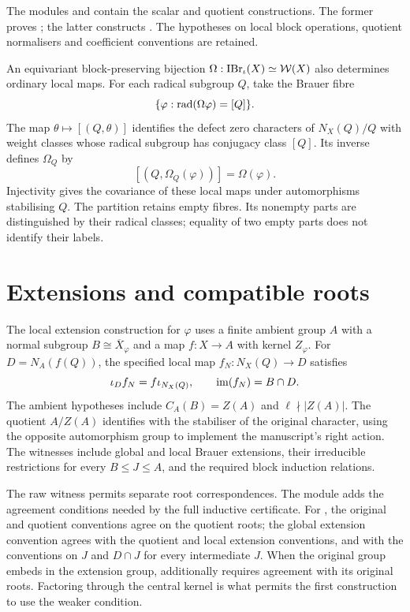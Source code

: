 \begin{samepage}
\begin{implementation}
The modules
and
contain the scalar and quotient constructions. The former proves
; the latter constructs
. The hypotheses on local block
operations, quotient normalisers and coefficient conventions are retained.
\end{implementation}
\end{samepage}

An equivariant block-preserving bijection
$\Omega:\operatorname{IBr}_\iota(X)\simeq\mathcal W(X)$ also determines ordinary
local maps. For each radical subgroup $Q$, take the Brauer fibre
\[
 \{\varphi:\operatorname{rad}(\Omega\varphi)=[Q]\}.
\]
The map $\theta\mapsto[(Q,\theta)]$ identifies the defect zero
characters of $N_X(Q)/Q$ with weight classes whose radical subgroup
has conjugacy class $[Q]$. Its inverse defines $\Omega_Q$ by
\[
 [(Q,\Omega_Q(\varphi))]=\Omega(\varphi).
\]
Injectivity gives the covariance of these local maps under
automorphisms stabilising $Q$. The partition retains empty fibres.
Its nonempty parts are distinguished by their radical classes;
equality of two empty parts does not identify their labels.

\section{Extensions and compatible roots}

The local extension construction for $\varphi$ uses a finite ambient
group $A$ with a normal subgroup $B\cong\overline X_\varphi$ and a map
$f:X\to A$ with kernel $Z_\varphi$. For $D=N_A(f(Q))$, the specified
local map $f_N:N_X(Q)\to D$ satisfies
\[
 \iota_D f_N=f\iota_{N_X(Q)},
 \qquad \operatorname{im}(f_N)=B\cap D.
\]
The ambient hypotheses include $C_A(B)=Z(A)$ and
$\ell\nmid |Z(A)|$. The quotient $A/Z(A)$ identifies with the stabiliser of the original
character, using the opposite automorphism group to implement the
manuscript's right action. The witnesses include global and local
Brauer extensions, their irreducible restrictions for every
$B\leq J\leq A$, and the required block induction relations.

The raw witness permits separate root correspondences. The module
 adds the agreement
conditions needed by the full inductive certificate.
For , the original and quotient conventions
agree on the quotient roots; the global extension convention agrees
with the quotient and local extension conventions, and with the
conventions on $J$ and $D\cap J$ for every intermediate $J$.
When the original group embeds in the extension group,
 additionally requires agreement with its
original roots. Factoring through the central kernel is what permits
the first construction to use the weaker condition.


